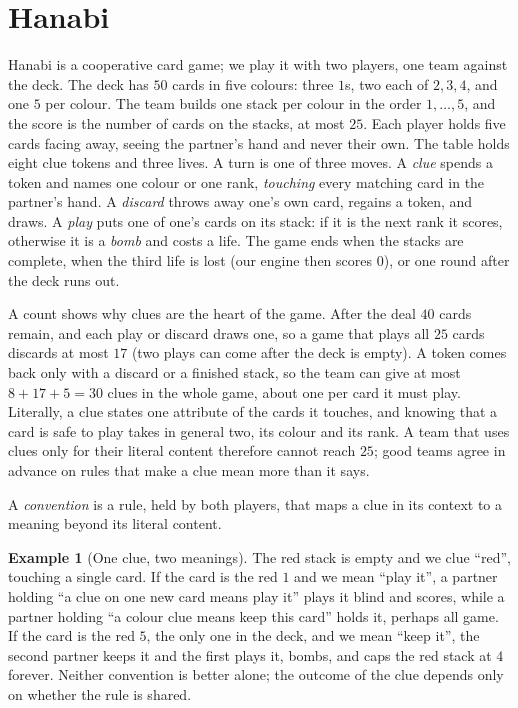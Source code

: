 \documentclass[11pt]{article}
\numberwithin{theorem}{section}
\theoremstyle{definition}
\newtheorem{example}[theorem]{Example}
\begin{document}
\section{Hanabi}\label{sec:hanabi}

Hanabi is a cooperative card game; we play it with two players, one team against the deck. The deck has $50$
cards in five colours: three $1$s, two each of $2,3,4$, and one $5$ per colour. The team builds one stack per colour in
the order $1,\dots,5$, and the score is the number of cards on the stacks, at most $25$. Each player holds five cards
facing away, seeing the partner's hand and never their own. The table holds eight clue tokens and three lives. A turn
is one of three moves. A \emph{clue} spends a token and names one colour or one rank, \emph{touching} every matching
card in the partner's hand. A \emph{discard} throws away one's own card, regains a token, and draws. A \emph{play}
puts one of one's cards on its stack: if it is the next rank it scores, otherwise it is a \emph{bomb} and costs a life.
The game ends when the stacks are complete, when the third life is lost (our engine then scores $0$), or one round after
the deck runs out.

A count shows why clues are the heart of the game. After the deal $40$ cards remain, and each play or
discard draws one, so a game that plays all $25$ cards discards at most $17$ (two plays can come after the deck is
empty). A token comes back only with a discard or a finished stack, so the team can give at most $8+17+5=30$ clues in
the whole game, about one per card it must play. Literally, a clue states one attribute of the cards it touches, and
knowing that a card is safe to play takes in general two, its colour and its rank. A team that uses clues only for
their literal content therefore cannot reach $25$; good teams agree in advance on rules that make a clue mean more than
it says.

\begin{definition}[Convention]
A \emph{convention} is a rule, held by both players, that maps a clue in its context to a meaning beyond its literal
content.
\end{definition}

\begin{example}[One clue, two meanings]\label{ex:clue}
The red stack is empty and we clue ``red'', touching a single card. If the card is the red $1$ and we mean ``play it'',
a partner holding ``a clue on one new card means play it'' plays it blind and scores, while a partner holding ``a
colour clue means keep this card'' holds it, perhaps all game. If the card is the red $5$, the only one in the deck, and
we mean ``keep it'', the second partner keeps it and the first plays it, bombs, and caps the red stack at $4$ forever.
Neither convention is better alone; the outcome of the clue depends only on whether the rule is shared.
\end{example}
\end{document}
